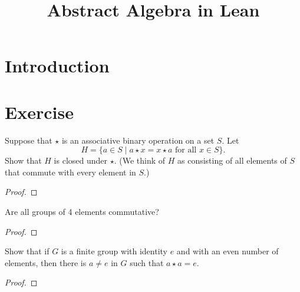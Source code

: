 \title{Abstract Algebra in Lean}




\maketitle


\tableofcontents
\section{Introduction}



\section{Exercise}

\nocite{*} %

\begin{theorem}[Exercise 1]\label{Ex1}
  \leanok
    Suppose that $\star$ is an associative binary operation on a set $S$. Let
    \[
    H = \{a \in S \mid a \star x = x \star a \text{ for all } x \in S\}.
    \]
    Show that $H$ is closed under $\star$. (We think of $H$ as consisting of all elements of $S$ that commute with every element in $S$.)
\end{theorem}
\begin{proof}
  \leanok
\end{proof}


\begin{theorem}[Exercise 2]\label{Ex2}
  \leanok
    Are all groups of 4 elements commutative?
\end{theorem}
\begin{proof}
  \leanok
\end{proof}


\begin{theorem}[Exercise 3]\label{Ex3}
  \leanok
    Show that if $G$ is a finite group with identity $e$ and with an even number of elements, then there is $a \neq e$ in $G$ such that $a \star a = e$.
\end{theorem}
\begin{proof}
  \leanok
\end{proof}


